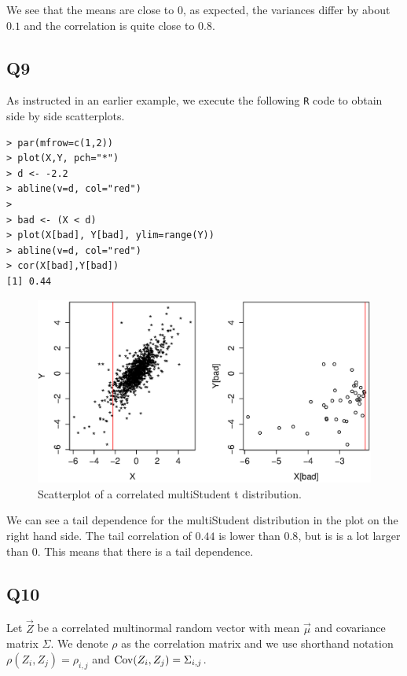 We see that the means are close to $0$, as expected, the variances differ by about $0.1$ and the correlation is quite close to $0.8$.

\subsection*{Q9}

As instructed in an earlier example, we execute the following \verb|R| code to obtain side by side scatterplots.

\begin{verbatim}
> par(mfrow=c(1,2))
> plot(X,Y, pch="*")
> d <- -2.2
> abline(v=d, col="red")
> 
> bad <- (X < d)
> plot(X[bad], Y[bad], ylim=range(Y))
> abline(v=d, col="red")
> cor(X[bad],Y[bad])
[1] 0.44
\end{verbatim}

\begin{center}
	\begin{figure}[H]
		\includegraphics[scale=.6]{NL1_Q9_scatterplot.eps} 
		\caption{Scatterplot of a correlated multiStudent t distribution.}
	\end{figure}
\end{center}


We can see a tail dependence for the multiStudent distribution in the plot on the right hand side. The tail correlation of $0.44$ is lower than $0.8$, but is is a lot larger than $0$. This means that there is a tail dependence.

\subsection*{Q10}

Let $\vec{Z}$ be a correlated multinormal random vector with mean $\vec{\mu}$ and covariance matrix $\Sigma$. We denote $\rho$ as the correlation matrix and we use shorthand notation $\rho(Z_i,Z_j) = \rho_{i,j}$ and $\operatorname{\text{Cov}}(Z_i,Z_j) = \Sigma_{i,j}$.

